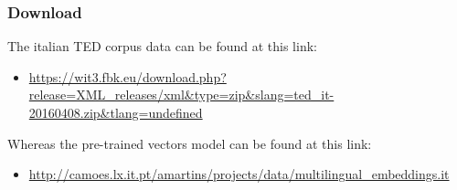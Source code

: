 \subsubsection{Download}
The italian TED corpus data can be found at this link:
\begin{itemize}
	\item \url{https://wit3.fbk.eu/download.php?release=XML_releases/xml\&type=zip\&slang=ted_it-20160408.zip\&tlang=undefined}
\end{itemize}
Whereas the pre-trained vectors model can be found at this link:
\begin{itemize}
	\item \url{http://camoes.lx.it.pt/amartins/projects/data/multilingual_embeddings.it}
\end{itemize}
